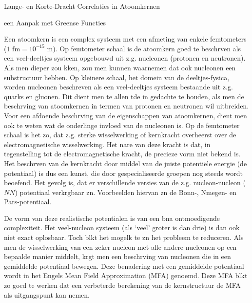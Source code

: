 \par\noindent%
\centerline{\large\SectFont Lange- en Korte-Dracht Correlaties in Atoomkernen}
\par\noindent%
\centerline{\large\SectFont een Aanpak met Greense Functies}
\par\noindent%
Een atoomkern is een complex systeem met een afmeting van enkele femtometers
($1\mbox{ fm}=10^{-15}\mbox{ m}$). Op femtometer schaal is de atoomkern goed
te beschr{\ij}ven als een veel-deeltjes systeem opgebouwd uit z.g. nucleonen 
(protonen en neutronen). Als men dieper zou k{\ij}ken, zou men kunnen
waarnemen dat ook nucleonen een substructuur hebben. Op kleinere schaal, het
domein van de deeltjes-fysica, worden nucleonen beschreven als een 
veel-deeltjes systeem bestaande uit z.g. quarks en gluonen.
Dit dient men te allen t{\ij}de in gedachte te houden, als men de 
beschr{\ij}ving
van atoomkernen in termen van protonen en neutronen wil uitbreiden.
Voor een afdoende beschr{\ij}ving van de eigenschappen van atoomkernen, dient 
men ook te weten wat de onderlinge invloed van de nucleonen is. Op de femtometer
schaal is het zo, dat z.g. sterke wisselwerking of kernkracht overheerst 
over de electromagnetische wisselwerking. Het nare van deze kracht is dat,
in tegenstelling tot de electromagnetische kracht, de precieze vorm
niet bekend is. 
Het beschr{\ij}ven van de kernkracht door middel van  
de juiste potenti\"ele energie (de potentiaal) is dus een kunst, die door 
gespecialiseerde groepen nog steeds wordt beoefend. Het gevolg is, dat er 
verschillende versies van de z.g. nucleon-nucleon ($NN$) potentiaal 
verkr{\ij}gbaar z{\ij}n. Voorbeelden hiervan z{\ij}n  
de Bonn-, N{\ij}megen- en Par{\ij}s-potentiaal.

De vorm van deze realistische potentialen is van een b{\ij}na ontmoedigende 
complexiteit. Het veel-nucleon systeem (als `veel' groter is dan drie) is dan 
ook niet exact oplosbaar. Toch bl{\ij}kt het mogel{\ij}k te z{\ij}n het 
probleem te reduceren.
Als men de wisselwerking van een zeker nucleon met alle andere nucleonen
op een bepaalde manier middelt, kr{\ij}gt men een beschr{\ij}ving van 
nucleonen die
in een gemiddelde potentiaal bewegen. Deze benadering met een gemiddelde 
potentiaal wordt in het Engels Mean Field Approximation (MFA) genoemd.
Deze MFA bl{\ij}kt zo goed te werken dat een verbeterde berekening van de 
kernstructuur de MFA als
uitgangspunt kan nemen.

